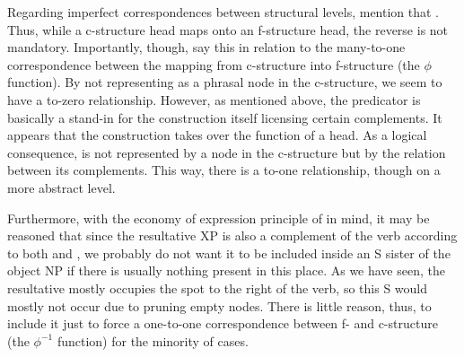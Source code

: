 Regarding imperfect correspondences between structural levels,
\citet{bresnan2016} mention that . Thus, while a c-structure
head maps onto an f-structure head, the reverse is not mandatory. Importantly,
though, \citet{bresnan2016} say this in relation to the many-to-one
correspondence between the mapping from c-structure into f-structure (the
$\phi$ function). By not representing \XCompl{} as a phrasal node in the
c-structure, we seem to have a to-zero relationship. However, as mentioned
above, the  predicator is basically a stand-in for the construction
itself licensing certain complements. It appears that the construction takes
over the function of a head. As a logical consequence, \ups{\XCompl{} \Pred{}}
is not represented by a node in the c-structure but by the relation between its
complements. This way, there is a to-one relationship, though on a more
abstract level.

Furthermore, with the economy of expression principle of \Lfg{} in mind, it
may be reasoned that since the resultative XP is also a complement of the verb
according to both \citet{simpson1983} and \citet{christie2013}, we probably do
not want it to be included inside an S sister of the object NP if there is
usually nothing present in this place. As we have seen, the resultative mostly
occupies the spot to the right of the verb, so this S would mostly not occur
due to pruning empty nodes. There is little reason, thus, to include it just to
force a one-to-one correspondence between f- and c-structure (the $\phi^{-1}$
function) for the minority of cases.


